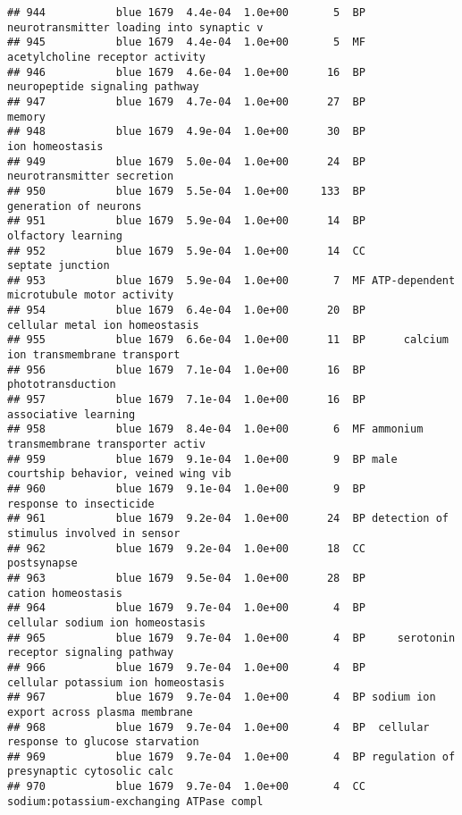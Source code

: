 \documentclass[]{article}
\begin{document}
\begin{verbatim}
## 944           blue 1679  4.4e-04  1.0e+00       5  BP neurotransmitter loading into synaptic v
## 945           blue 1679  4.4e-04  1.0e+00       5  MF          acetylcholine receptor activity
## 946           blue 1679  4.6e-04  1.0e+00      16  BP           neuropeptide signaling pathway
## 947           blue 1679  4.7e-04  1.0e+00      27  BP                                   memory
## 948           blue 1679  4.9e-04  1.0e+00      30  BP                          ion homeostasis
## 949           blue 1679  5.0e-04  1.0e+00      24  BP               neurotransmitter secretion
## 950           blue 1679  5.5e-04  1.0e+00     133  BP                    generation of neurons
## 951           blue 1679  5.9e-04  1.0e+00      14  BP                       olfactory learning
## 952           blue 1679  5.9e-04  1.0e+00      14  CC                         septate junction
## 953           blue 1679  5.9e-04  1.0e+00       7  MF ATP-dependent microtubule motor activity
## 954           blue 1679  6.4e-04  1.0e+00      20  BP           cellular metal ion homeostasis
## 955           blue 1679  6.6e-04  1.0e+00      11  BP      calcium ion transmembrane transport
## 956           blue 1679  7.1e-04  1.0e+00      16  BP                        phototransduction
## 957           blue 1679  7.1e-04  1.0e+00      16  BP                     associative learning
## 958           blue 1679  8.4e-04  1.0e+00       6  MF ammonium transmembrane transporter activ
## 959           blue 1679  9.1e-04  1.0e+00       9  BP male courtship behavior, veined wing vib
## 960           blue 1679  9.1e-04  1.0e+00       9  BP                  response to insecticide
## 961           blue 1679  9.2e-04  1.0e+00      24  BP detection of stimulus involved in sensor
## 962           blue 1679  9.2e-04  1.0e+00      18  CC                              postsynapse
## 963           blue 1679  9.5e-04  1.0e+00      28  BP                       cation homeostasis
## 964           blue 1679  9.7e-04  1.0e+00       4  BP          cellular sodium ion homeostasis
## 965           blue 1679  9.7e-04  1.0e+00       4  BP     serotonin receptor signaling pathway
## 966           blue 1679  9.7e-04  1.0e+00       4  BP       cellular potassium ion homeostasis
## 967           blue 1679  9.7e-04  1.0e+00       4  BP sodium ion export across plasma membrane
## 968           blue 1679  9.7e-04  1.0e+00       4  BP  cellular response to glucose starvation
## 969           blue 1679  9.7e-04  1.0e+00       4  BP regulation of presynaptic cytosolic calc
## 970           blue 1679  9.7e-04  1.0e+00       4  CC sodium:potassium-exchanging ATPase compl

\end{verbatim}
\end{document}
